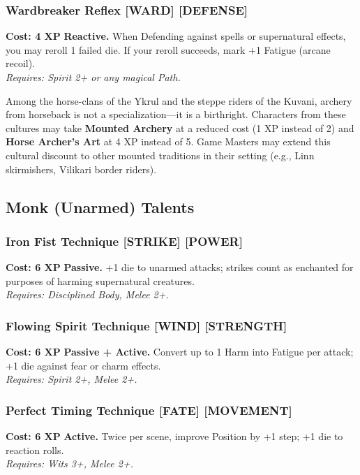\documentclass[12pt,a4paper]{book}
\begin{document}
\subsubsection*{Wardbreaker Reflex \textnormal{[WARD] [DEFENSE]}}
\label{talent:wardbreaker-reflex}
\textbf{Cost: 4 XP} \textbf{Reactive.} When Defending against spells or supernatural effects, you may reroll 1 failed die. If your reroll succeeds, mark +1 Fatigue (arcane recoil). \\
\textit{Requires: Spirit 2+ or any magical Path.}

\begin{tcolorbox}[colback=blue!5!white,colframe=blue!75!black,title=\textbf{Mounted Combat Traditions},breakable]
Among the horse-clans of the Ykrul and the steppe riders of the Kuvani, archery from horseback is not a specialization---it is a birthright. Characters from these cultures may take \textbf{Mounted Archery} at a reduced cost (1 XP instead of 2) and \textbf{Horse Archer's Art} at 4 XP instead of 5. Game Masters may extend this cultural discount to other mounted traditions in their setting (e.g., Linn skirmishers, Vilikari border riders).
\end{tcolorbox}

\subsection*{Monk (Unarmed) Talents}
\label{sec:major-monk}

\subsubsection*{Iron Fist Technique \textnormal{[STRIKE] [POWER]}}
\label{talent:iron-fist-technique}
\textbf{Cost: 6 XP} \textbf{Passive.} +1 die to unarmed attacks; strikes count as enchanted for purposes of harming supernatural creatures. \\
\textit{Requires: Disciplined Body, Melee 2+.}

\subsubsection*{Flowing Spirit Technique \textnormal{[WIND] [STRENGTH]}}
\label{talent:flowing-spirit-technique}
\textbf{Cost: 6 XP} \textbf{Passive + Active.} Convert up to 1 Harm into Fatigue per attack; +1 die against fear or charm effects. \\
\textit{Requires: Spirit 2+, Melee 2+.}

\subsubsection*{Perfect Timing Technique \textnormal{[FATE] [MOVEMENT]}}
\label{talent:perfect-timing-technique}
\textbf{Cost: 6 XP} \textbf{Active.} Twice per scene, improve Position by +1 step; +1 die to reaction rolls. \\
\textit{Requires: Wits 3+, Melee 2+.}
\end{document}
